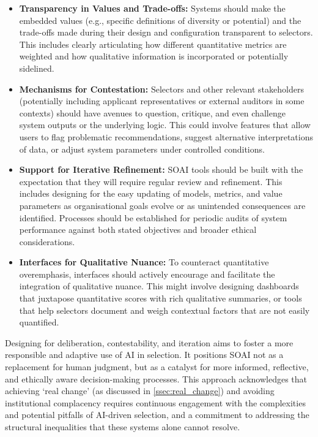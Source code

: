 \begin{itemize}
    \item \textbf{Transparency in Values and Trade-offs:} Systems should make the embedded values (e.g., specific definitions of diversity or potential) and the trade-offs made during their design and configuration transparent to selectors. This includes clearly articulating how different quantitative metrics are weighted and how qualitative information is incorporated or potentially sidelined.
    \item \textbf{Mechanisms for Contestation:} Selectors and other relevant stakeholders (potentially including applicant representatives or external auditors in some contexts) should have avenues to question, critique, and even challenge system outputs or the underlying logic. This could involve features that allow users to flag problematic recommendations, suggest alternative interpretations of data, or adjust system parameters under controlled conditions.
    \item \textbf{Support for Iterative Refinement:} SOAI tools should be built with the expectation that they will require regular review and refinement. This includes designing for the easy updating of models, metrics, and value parameters as organisational goals evolve or as unintended consequences are identified. Processes should be established for periodic audits of system performance against both stated objectives and broader ethical considerations.
    \item \textbf{Interfaces for Qualitative Nuance:} To counteract quantitative overemphasis, interfaces should actively encourage and facilitate the integration of qualitative nuance. This might involve designing dashboards that juxtapose quantitative scores with rich qualitative summaries, or tools that help selectors document and weigh contextual factors that are not easily quantified.
\end{itemize}

Designing for deliberation, contestability, and iteration aims to foster a more responsible and adaptive use of AI in selection. It positions SOAI not as a replacement for human judgment, but as a catalyst for more informed, reflective, and ethically aware decision-making processes. This approach acknowledges that achieving `real change' (as discussed in \ref{ssec:real_change}) and avoiding institutional complacency requires continuous engagement with the complexities and potential pitfalls of AI-driven selection, and a commitment to addressing the structural inequalities that these systems alone cannot resolve.


